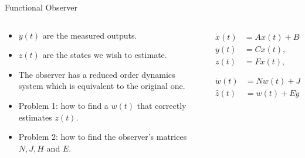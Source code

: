 \begin{slide}{Functional Observer}
  \begin{columns}[c]
    \begin{column}{0.48\textwidth}
      \begin{itemize}
        \item \(y(t)\) are the measured outputs.
        \item \(z(t)\) are the states we wish to estimate.
        \item The observer has a reduced order dynamics system which is
              equivalent to the original one.
        \item Problem 1: how to find a \(w(t)\) that correctly estimates
              \(z(t)\).
        \item Problem 2: how to find the observer's matrices \(N,J,H\) and
              \(E\).
      \end{itemize}
    \end{column}%
    \hfill%
    \begin{column}{0.48\textwidth}
      \begin{align}
        \begin{split}
          \dot{x}(t) & = Ax(t) + Bu(t) + Lf(t), \\
          y(t)       & = Cx(t),                 \\
          z(t)       & = Fx(t),
        \end{split} \\\nonumber\\
        \begin{split}
          \dot{w}(t) & = Nw(t) + Jy(t) + Hu(t), \\
          \hat{z}(t) & = w(t) + Ey(t).
        \end{split}
      \end{align}
    \end{column}%
  \end{columns}
\end{slide}

